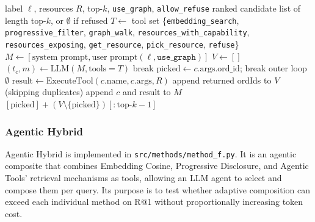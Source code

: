 \begin{algorithm}[!t]\small
  \caption{Agentic Hybrid --- Agentic meta-retrieval (\texttt{src/methods/method\_f.py})}
  \label{alg:method-f}
  \begin{algorithmic}[1]
  \REQUIRE label $\ell$, resources $R$, top-$k$, \texttt{use\_graph}, \texttt{allow\_refuse}
  \ENSURE ranked candidate list of length top-$k$, or $\emptyset$ if refused
  \STATE $T \leftarrow$ tool set \{\texttt{embedding\_search}, \texttt{progressive\_filter}, \texttt{graph\_walk}, \texttt{resources\_with\_capability}, \texttt{resources\_exposing}, \texttt{get\_resource}, \texttt{pick\_resource}, \texttt{refuse}\}
  \STATE $M \leftarrow [\text{system prompt}, \text{user prompt}(\ell, \texttt{use\_graph})]$
  \STATE $V \leftarrow []$ 
    \STATE $(t_c, m) \leftarrow \mathrm{LLM}(M, \text{tools}{=}T)$
      \STATE break 
    \ENDIF
        \STATE $\text{picked} \leftarrow c.\text{args.ord\_id}$; break outer loop
        \RETURN $\emptyset$
      \ELSE
        \STATE $\text{result} \leftarrow \mathrm{ExecuteTool}(c.\text{name}, c.\text{args}, R)$
        \STATE append returned ordIds to $V$ (skipping duplicates)
        \STATE append $c$ and $\text{result}$ to $M$
      \ENDIF
    \ENDFOR
  \ENDFOR
  \RETURN $[\text{picked}] + (V \setminus \{\text{picked}\})[:{\text{top-}k}{-}1]$
  \STATE {}
  \end{algorithmic}
\end{algorithm}

\subsubsection{Agentic Hybrid}

Agentic Hybrid is implemented in \texttt{src/methods/method\_f.py}. It is an agentic composite that combines Embedding Cosine, Progressive Disclosure, and Agentic Tools' retrieval mechanisms as tools, allowing an LLM agent to select and compose them per query. Its purpose is to test whether adaptive composition can exceed each individual method on R@1 without proportionally increasing token cost.

